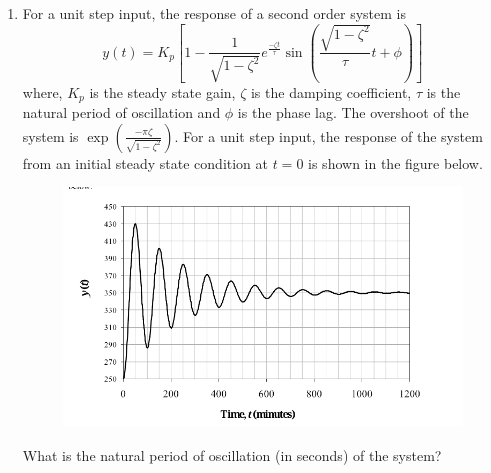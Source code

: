 \documentclass[journal,12pt,onecolumn]{IEEEtran}
\theoremstyle{remark}
\begin{document}
\begin{enumerate}
\item For a unit step input, the response of a second order system is
\[y(t) = K_p \left[ 1 - \frac{1}{\sqrt{1-\zeta^2}} e^{\frac{-\zeta t}{\tau}} \sin \left( \frac{\sqrt{1-\zeta^2}}{\tau} t + \phi \right) \right]\]
where, $K_p$ is the steady state gain, $\zeta$ is the damping coefficient, $\tau$ is the natural period of oscillation and $\phi$ is the phase lag. The overshoot of the system is $\exp \left( \frac{-\pi\zeta}{\sqrt{1-\zeta^2}} \right)$. For a unit step input, the response of the system from an initial steady state condition at $t = 0$ is shown in the figure below.
\begin{figure}[H]
    \centering
    \includegraphics[width=0.5\columnwidth]{figs/qn 53.jpg}
    \caption{}
    \label{fig:qn 53.jpg}
\end{figure}
What is the natural period of oscillation (in seconds) of the system?
\hfill{}
\begin{enumerate}
\end{enumerate}


\end{enumerate}
\end{document}
